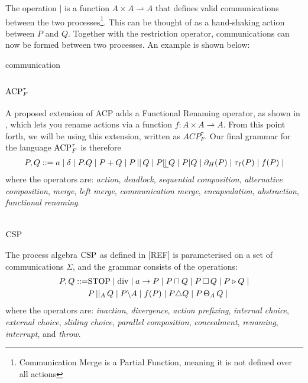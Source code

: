 \documentclass[../hons_project.tex]{subfiles}
\begin{document}
The operation $\mid$ is a function $A \times A \rightharpoonup A$ that defines valid communications between the two processes\footnote{Communication Merge is a Partial Function, meaning it is not defined over all actions}. This can be thought of as a hand-shaking action between $P$ and $Q$. Together with the restriction operator, communications can now be formed between two processes. An example is shown below:

{communication}

\subsection{\texorpdfstring{$\mathrm{ACP}_{F}^{\tau}$}{acptf}}

A proposed extension of ACP adds a Functional Renaming operator, as shown in \cite{vanglabbeekExpressivenessACP1995}, which lets you rename actions via a function $f : A \times A \rightharpoonup A$. From this point forth, we will be using this extension, written as $ACP^{\tau}_{F}$. Our final grammar for the language $\mathrm{ACP}_{F}^{\tau}$ is therefore
\begin{align*}
   P, Q ::= a \mid \delta \mid P . Q \mid P + Q \mid P \merge Q \mid P \leftmerge Q \mid P | Q \mid \restrict(P) \mid \abtau(P) \mid f(P) \mid
\end{align*}
where the operators are: \textit{action}, \textit{deadlock}, \textit{sequential composition}, \textit{alternative composition},  \textit{merge}, \textit{left merge}, \textit{communication merge}, \textit{encapsulation}, \textit{abstraction}, \textit{functional renaming}.



\section{\texorpdfstring{$\mathrm{CSP}$}{CSP}}\label{ssec:CSP}
The process algebra $\mathrm{CSP}$ as defined in [REF] is parameterised on a set of communications $\Sigma$, and the grammar consists of the operations:
\begin{align*}
   P, Q ::= &\mathrm{STOP} \mid \mathrm{div} \mid a\to P \mid P \sqcap Q \mid P \,\square\, Q \mid P \triangleright Q \mid \\
	&P \,\vert\vert_{A}\, Q \mid P \backslash A \mid f(P) \mid P \triangle Q \mid P \,\Theta_{A}\, Q \mid 
\end{align*}
where the operators are: \textit{inaction}, \textit{divergence}, \textit{action prefixing}, \textit{internal choice}, \textit{external choice}, \textit{sliding choice}, \textit{parallel composition}, \textit{concealment}, \textit{renaming}, \textit{interrupt}, and \textit{throw}.
\end{document}
